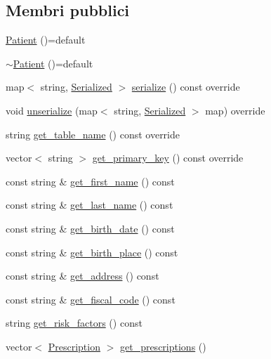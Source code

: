 \subsection*{Membri pubblici}
\begin{DoxyCompactItemize}
\item 
\hyperlink{classmm_1_1model_1_1_patient_ad15758bdb4995cf5f0b2830eef2b4b43}{Patient} ()=default
\item 
\hyperlink{classmm_1_1model_1_1_patient_ad9b2919b2efa8f1e7f6d405757d73ccb}{$\sim$\+Patient} ()=default
\item 
map$<$ string, \hyperlink{structmm_1_1_serialized}{Serialized} $>$ \hyperlink{classmm_1_1model_1_1_patient_ae3ac219cd109e8c53daaf9b2758c3a0e}{serialize} () const override
\item 
void \hyperlink{classmm_1_1model_1_1_patient_a7e1d8cbfc2cdd653281dce87497c6065}{unserialize} (map$<$ string, \hyperlink{structmm_1_1_serialized}{Serialized} $>$ map) override
\item 
string \hyperlink{classmm_1_1model_1_1_patient_abe79da3e4fabd80e039ae4880dfa76cb}{get\+\_\+table\+\_\+name} () const override
\item 
vector$<$ string $>$ \hyperlink{classmm_1_1model_1_1_patient_ae85640f3cb3d34bb57e1129ef46a0cbf}{get\+\_\+primary\+\_\+key} () const override
\item 
const string \& \hyperlink{classmm_1_1model_1_1_patient_a3661b2666d368492511ed3bad79c0389}{get\+\_\+first\+\_\+name} () const
\item 
const string \& \hyperlink{classmm_1_1model_1_1_patient_a88c0051957b5a6f172cdc35432505923}{get\+\_\+last\+\_\+name} () const
\item 
const string \& \hyperlink{classmm_1_1model_1_1_patient_ac54b024c619d6f31c72766a01bc5d0ee}{get\+\_\+birth\+\_\+date} () const
\item 
const string \& \hyperlink{classmm_1_1model_1_1_patient_a4e4770a79fef23b54026e013586e61fa}{get\+\_\+birth\+\_\+place} () const
\item 
const string \& \hyperlink{classmm_1_1model_1_1_patient_a0db04bf2c2ae5b9eb6417f4b6e74a84a}{get\+\_\+address} () const
\item 
const string \& \hyperlink{classmm_1_1model_1_1_patient_a29590c6ce9d2b19dbdff3330ee5e4523}{get\+\_\+fiscal\+\_\+code} () const
\item 
string \hyperlink{classmm_1_1model_1_1_patient_a7ab70bc4aafc95f687c29d02ac398e06}{get\+\_\+risk\+\_\+factors} () const
\item 
vector$<$ \hyperlink{classmm_1_1model_1_1_prescription}{Prescription} $>$ \hyperlink{classmm_1_1model_1_1_patient_a2a33032170e0cadf905dd263a3364b65}{get\+\_\+prescriptions} ()

\end{DoxyCompactItemize}
